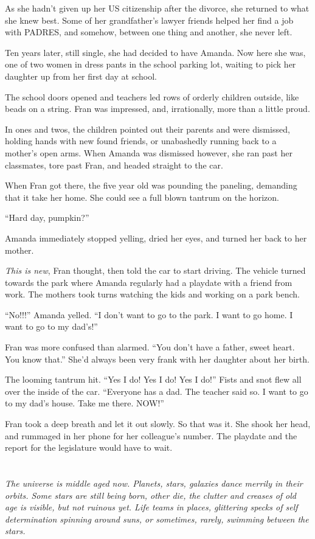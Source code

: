 \documentclass{article}
\begin{document}
As she hadn’t given up her US citizenship after the divorce, she returned to what she knew best. Some of her grandfather’s lawyer friends helped her find a job with PADRES, and somehow, between one thing and another, she never left. 

Ten years later, still single, she had decided to have Amanda. Now here she was, one of two women in dress pants in the school parking lot, waiting to pick her daughter up from her first day at school. 

The school doors opened and teachers led rows of orderly children outside, like beads on a string. Fran was impressed, and, irrationally, more than a little proud. 

In ones and twos, the children pointed out their parents and were dismissed, holding hands with new found friends, or unabashedly running back to a mother’s open arms. When Amanda was dismissed however, she ran past her classmates, tore past Fran, and headed straight to the car.

When Fran got there, the five year old was pounding the paneling, demanding that it take her home. She could see a full blown tantrum on the horizon. 

“Hard day, pumpkin?” 

Amanda immediately stopped yelling, dried her eyes, and turned her back to her mother. 

\emph{This is new}, Fran thought, then told the car to start driving. The vehicle turned towards the park where Amanda regularly had a playdate with a friend from work. The mothers took turns watching the kids and working on a park bench. 

“No!!!” Amanda yelled. “I don’t want to go to the park. I want to go home. I want to go to my dad’s!”

Fran was more confused than alarmed. “You don’t have a father, sweet heart. You know that.” She’d always been very frank with her daughter about her birth. 

The looming tantrum hit. “Yes I do! Yes I do! Yes I do!” Fists and snot flew all over the inside of the car. “Everyone has a dad. The teacher said so. I want to go to my dad’s house. Take me there. NOW!”

Fran took a deep breath and let it out slowly. So that was it. She shook her head, and rummaged in her phone for her colleague’s number. The playdate and the report for the legislature would have to wait.


\section{}
\emph{The universe is middle aged now. Planets, stars, galaxies dance merrily in their orbits. Some stars are still being born, other die, the clutter and creases of old age is visible, but not ruinous yet. Life teams in places, glittering specks of self determination spinning around suns, or sometimes, rarely, swimming between the stars. }
\end{document}

